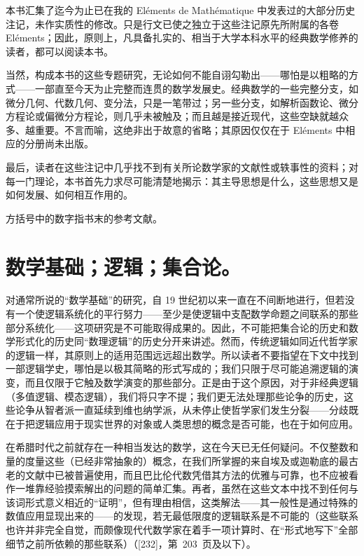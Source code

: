 
本书汇集了迄今为止已在我的 Eléments de Mathématique 中发表过的大部分历史注记，未作实质性的修改。只是行文已使之独立于这些注记原先所附属的各卷 Eléments；因此，原则上，凡具备扎实的、相当于大学本科水平的经典数学修养的读者，都可以阅读本书。

当然，构成本书的这些专题研究，无论如何不能自诩勾勒出——哪怕是以粗略的方式——一部直至今天为止完整而连贯的数学发展史。经典数学的一些完整分支，如微分几何、代数几何、变分法，只是一笔带过；另一些分支，如解析函数论、微分方程论或偏微分方程论，则几乎未被触及；而且越是接近现代，这些空缺就越众多、越重要。不言而喻，这绝非出于故意的省略；其原因仅仅在于 Eléments 中相应的分册尚未出版。

最后，读者在这些注记中几乎找不到有关所论数学家的文献性或轶事性的资料；对每一门理论，本书首先力求尽可能清楚地揭示：其主导思想是什么，这些思想又是如何发展、如何相互作用的。

方括号中的数字指书末的参考文献。

\tableofcontents
\mainmatter

\chapter{数学基础；逻辑；集合论。}

对通常所说的“数学基础”的研究，自 19 世纪初以来一直在不间断地进行，但若没有一个使逻辑系统化的平行努力——至少是使逻辑中支配数学命题之间联系的那些部分系统化——这项研究是不可能取得成果的。因此，不可能把集合论的历史和数学形式化的历史同“数理逻辑”的历史分开来讲述。然而，传统逻辑如同近代哲学家的逻辑一样，其原则上的适用范围远远超出数学。所以读者不要指望在下文中找到一部逻辑学史，哪怕是以极其简略的形式写成的；我们只限于尽可能追溯逻辑的演变，而且仅限于它触及数学演变的那些部分。正是由于这个原因，对于非经典逻辑（多值逻辑、模态逻辑），我们将只字不提；我们更无法处理那些论争的历史，这些论争从智者派一直延续到维也纳学派，从未停止使哲学家们发生分裂——分歧既在于把逻辑应用于现实世界的对象或人类思想的概念是否可能，也在于如何应用。

在希腊时代之前就存在一种相当发达的数学，这在今天已无任何疑问。不仅整数和量的度量这些（已经非常抽象的）概念，在我们所掌握的来自埃及或迦勒底的最古老的文献中已被普遍使用，而且巴比伦代数凭借其方法的优雅与可靠，也不应被看作一堆靠经验摸索解出的问题的简单汇集。再者，虽然在这些文本中找不到任何与该词形式意义相近的“证明”，但有理由相信，这类解法——其一般性是通过特殊的数值应用显现出来的——的发现，若无最低限度的逻辑联系是不可能的（这些联系也许并非完全自觉，而颇像现代代数学家在着手一项计算时、在“形式地写下”全部细节之前所依赖的那些联系）（{[}232{]}，第~203~页及以下）。

